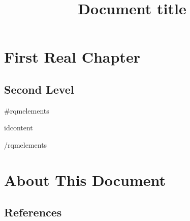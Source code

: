 \documentclass[a4paper,11pt]{article}
\title{Document title}
\begin{document}
	\setcounter{tocdepth}{3}
	\renewcommand\contentsname{Contents}
	\tableofcontents
	
	\bigskip
	
	\setcounter{tocdepth}{1}
	\renewcommand\contentsname{List of Figures}
	\begingroup
	\let\clearpage\relax
	\listoffigures
	\endgroup
	
	\bigskip

	\setcounter{tocdepth}{1}
	\renewcommand\contentsname{List of Tables}
	\begingroup
	\let\clearpage\relax
	\listoftables
	\endgroup

	\section{First Real Chapter}
	
	\subsection{Second Level}
	
	{{#rqmelements}}
    \begin{paragraph}
    {{id}}{{content}}
    \end{paragraph}
	{{/rqmelements}}
	
	\section{About This Document}
	
	\subsection{References}
	
\end{document}
